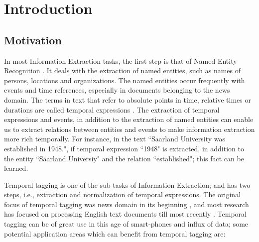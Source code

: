 \chapter{Introduction} \label{the-chapter-1}
\section{Motivation}
In most Information Extraction tasks, the first step is that of Named Entity Recognition \cite{DBLP:books/lib/JurafskyM09}. It deals with the extraction of named entities, such as names of persons, locations and organizations. The named entities occur frequently with events and time references, especially in documents belonging to the news domain. The terms in text that refer to absolute points in time, relative times or durations are called temporal expressions \cite{DBLP:books/lib/JurafskyM09}. The extraction of temporal expressions and events, in addition to the extraction of named entities can enable us to extract relations between entities and events to make information extraction more rich temporally. For instance, in the text ``Saarland University was established in 1948.", if temporal expression ``1948" is extracted, in addition to the entity ``Saarland Universiy" and the relation ``established"; this fact can be learned.

Temporal tagging is one of the sub tasks of Information Extraction; and has two steps, i.e., extraction and normalization of temporal expressions. The original focus of temporal tagging was news domain in its beginning \cite{DBLP:series/synthesis/2016Strotgen}, and most research has focused on processing English text documents till most recently \cite{DBLP:phd/de/Strotgen15}. Temporal tagging can be of great use in this age of smart-phones and influx of data; some potential application areas which can benefit from temporal tagging are:

